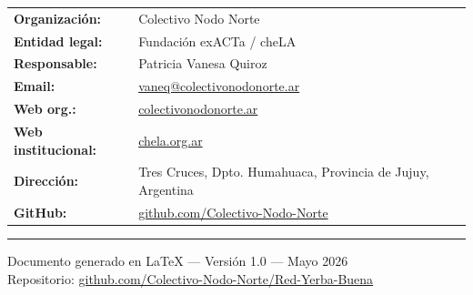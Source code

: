 \documentclass[12pt,a4paper]{article}
\begin{document}
\begin{tabular}{ll}
\textbf{Organización:}     & Colectivo Nodo Norte \\
\textbf{Entidad legal:}    & Fundación exACTa / cheLA \\
\textbf{Responsable:}      & Patricia Vanesa Quiroz \\
\textbf{Email:}            & \href{mailto:vaneq@colectivonodonorte.ar}{vaneq@colectivonodonorte.ar} \\
\textbf{Web org.:}         & \href{https://colectivonodonorte.ar}{colectivonodonorte.ar} \\
\textbf{Web institucional:}& \href{https://chela.org.ar}{chela.org.ar} \\
\textbf{Dirección:}        & Tres Cruces, Dpto. Humahuaca, Provincia de Jujuy, Argentina \\
\textbf{GitHub:}           & \href{https://github.com/Colectivo-Nodo-Norte}{github.com/Colectivo-Nodo-Norte} \\
\end{tabular}

\vfill
{\color{primary}\rule{\linewidth}{1pt}}
{\small\color{darkgray}\centering
  Documento generado en \LaTeX{} --- Versión 1.0 --- Mayo 2026\\
  Repositorio: \href{https://github.com/Colectivo-Nodo-Norte/Red-Yerba-Buena}{github.com/Colectivo-Nodo-Norte/Red-Yerba-Buena}
}
\end{document}
